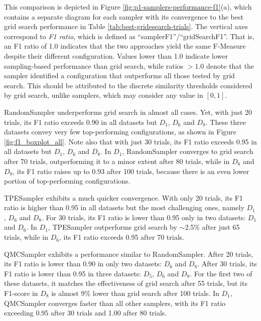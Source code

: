 This comparison is depicted in Figure \ref{fig:p1-samplers-performance-f1}(a), which contains a separate diagram for each sampler with its convergence to the best grid search performance in Table \ref{tab:best-gridesearch-trials}. The vertical axes 
correspond to \textit{F1 ratio}, which is defined as ``samplerF1''/``gridSearchF1''. That is, an F1 ratio of 1.0 indicates that the two approaches yield the same F-Measure despite their different configuration. Values lower than 1.0 indicate lower sampling-based performance than grid search, while ratios $>1.0$ denote that the sampler identified a configuration that outperforms all those tested by grid search. This should be attributed to the discrete similarity thresholds considered by grid search, unlike samplers, which may consider any value in $[0,1]$.

RandomSampler underperforms grid search in almost all cases. Yet, with just 20 trials, its F1 ratio exceeds 0.90 in all datasets but
$D_1$, $D_6$ and $D_8$.
These three datasets 
convey very few top-performing configurations, as shown in Figure \ref{fig:f1_boxplot_all}. 
Note also that with just 30 trials, its F1 ratio exceeds 0.95 in all datasets but $D_1$, $D_6$ and $D_8$. In $D_1$, RandomSampler converges to grid search after 70 trials, outperforming it to a minor extent after 80 trials, while in $D_6$ and $D_8$, its F1 ratio raises up to 0.93 after 100 trials, because there is an even lower portion of top-performing configurations. 

TPESampler exhibits a much 
quicker
convergence. With only 20 trials, its F1 ratio is higher than 0.95 in all datasets but the most challenging ones, namely $D_1$, $D_6$ and $D_8$. For 30 trials, its F1 ratio is lower than 0.95 only in two datasets: $D_1$ and $D_6$. In $D_1$, TPESampler outperforms grid search by $\sim$2.5\% after just 65 trials, while in $D_6$, its F1 ratio exceeds 0.95 after 70 trials. 

QMCSampler exhibits a performance similar to RandomSampler. After 20 trials, its F1 ratio is lower than 0.90 in only two datasets: $D_6$ and $D_8$. After 30 trials, its F1 ratio is lower than 0.95 in three datasets: $D_5$, $D_6$ and $D_8$. For the first two of these datasets, it matches the effectiveness of grid search after 55 trials, but its F1-score in $D_8$ is almost 9\% lower than grid search after 100 trials. In $D_1$, QMCSampler converges faster than all other samplers, with its F1 ratio exceeding 0.95 after 30 trials and 1.00 
after 80 trials. 

